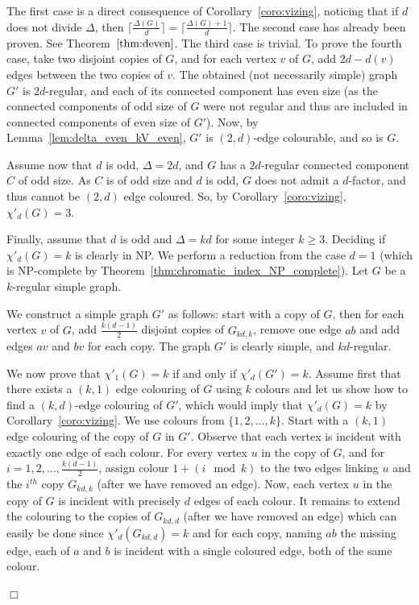 \documentclass[11pt]{article}
\newcounter{claim}
\newenvironment{proof}[1][]%
 {\noindent {\setcounter{claim}{0}\sc proof ---
   }{#1}{}}{\hfill$\Box$\vspace{2ex}}
\begin{document}
\begin{proof}
The first case is a direct consequence of Corollary~\ref{coro:vizing}, noticing that if $d$ does not divide $\Delta$, then $\lceil \frac{\Delta(G)}{d} \rceil = \lceil \frac{\Delta(G)+1}{d} \rceil$. 
The second case has already been proven. See Theorem~$\ref{thm:deven}$.
The third case is trivial. 
To prove the fourth case, take two disjoint copies of $G$, and for each vertex $v$ of $G$, add $2d - d(v)$ edges between the two copies of $v$. The obtained (not necessarily simple) graph $G'$ is $2d$-regular, and each of its connected component has even size  (as the connected components of odd size of $G$ were not regular and thus are included in connected components of even size of $G'$). Now, by Lemma~\ref{lem:delta_even_kV_even}, $G'$ is $(2,d)$-edge colourable, and so is $G$.

Assume now that $d$ is odd, $\Delta = 2d$, and $G$ has a $2d$-regular connected component $C$ of odd size. As $C$ is of odd size and $d$ is odd, $G$ does not admit a $d$-factor, and thus cannot be $(2,d)$ edge coloured. So, by Corollary~\ref{coro:vizing}, $\chi'_d(G) = 3$. 

Finally, assume that $d$ is odd and $\Delta = kd$ for some integer $k \geq 3$. 
Deciding if $\chi'_d(G) = k$ is clearly in NP. 
 We perform a reduction from the case $d=1$ (which is NP-complete by Theorem~\ref{thm:chromatic_index_NP_complete}).  Let $G$ be a $k$-regular simple graph.

We construct a simple graph $G'$ as follows: start with a copy of $G$, then for each vertex $v$ of $G$, add $\frac{k(d-1)}{2}$ disjoint copies of $G_{kd,k}$, remove one edge $ab$ and add edges $av$ and $bv$ for each copy. 
The graph $G'$ is clearly simple, and $kd$-regular. 

We now prove that $\chi'_{1}(G) = k$ if and only if $\chi'_{d}(G') = k$. 
Assume  first that there exists a $(k,1)$ edge colouring of $G$ using $k$ colours and let us show how to find a $(k,d)$-edge colouring of $G'$, which would imply that $\chi'_d(G) = k$ by Corollary~\ref{coro:vizing}. We use colours from $\{1, 2,\dots, k\}$.  
Start with a $(k,1)$ edge colouring of the copy of $G$ in $G'$. Observe that each vertex is incident with exactly one edge of each colour. 
For every vertex $u$ in the copy of $G$, and for $i=1,2, \dots, \frac{k(d-1)}{2}$, assign colour $1 + (i \mod k)$ to the two edges linking $u$ and the $i^{th}$ copy $G_{kd,k}$ (after we have removed an edge). Now, each vertex $u$ in the copy of $G$ is incident with precisely $d$ edges of each colour. It remains to extend the colouring to the copies of $G_{kd,d}$ (after we have removed an edge) which can easily be done since $\chi'_d(G_{kd,d}) = k$ and for each copy, naming $ab$ the missing edge, each of $a$ and $b$ is incident with a single coloured edge, both of the same colour.  


\end{proof}
\end{document}
